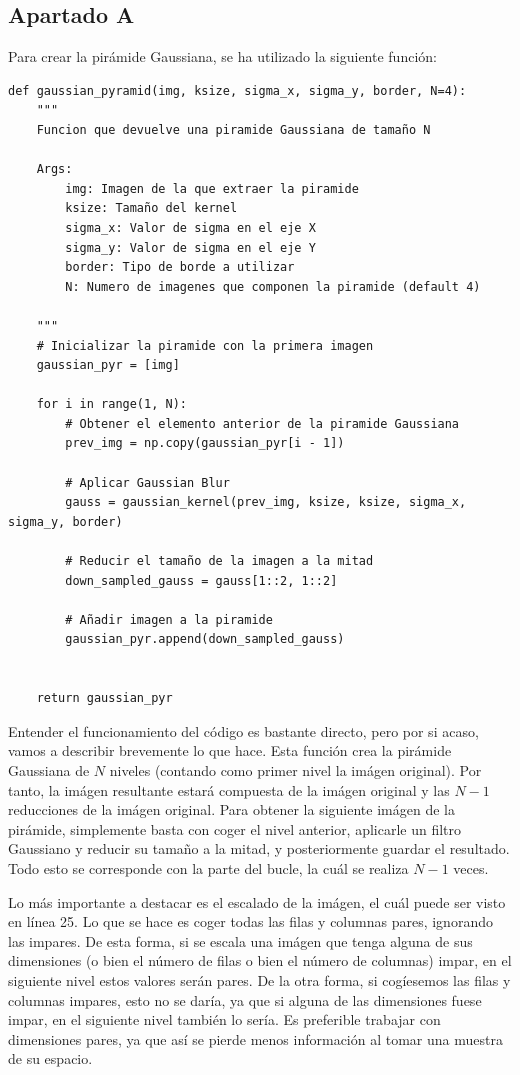 \documentclass[11pt,a4paper]{article}
\begin{document}
\subsection{Apartado A}

Para crear la pirámide Gaussiana, se ha utilizado la siguiente función:

\begin{lstlisting}[caption={Función que crea una priámide Gaussiana.},label={alg:guassian-pyramid}]
def gaussian_pyramid(img, ksize, sigma_x, sigma_y, border, N=4):
    """
    Funcion que devuelve una piramide Gaussiana de tamaño N

    Args:
        img: Imagen de la que extraer la piramide
        ksize: Tamaño del kernel
        sigma_x: Valor de sigma en el eje X
        sigma_y: Valor de sigma en el eje Y
        border: Tipo de borde a utilizar
        N: Numero de imagenes que componen la piramide (default 4)

    """
    # Inicializar la piramide con la primera imagen
    gaussian_pyr = [img]

    for i in range(1, N):
        # Obtener el elemento anterior de la piramide Gaussiana
        prev_img = np.copy(gaussian_pyr[i - 1])

        # Aplicar Gaussian Blur
        gauss = gaussian_kernel(prev_img, ksize, ksize, sigma_x, sigma_y, border)

        # Reducir el tamaño de la imagen a la mitad
        down_sampled_gauss = gauss[1::2, 1::2]

        # Añadir imagen a la piramide
        gaussian_pyr.append(down_sampled_gauss)


    return gaussian_pyr
\end{lstlisting}

Entender el funcionamiento del código es bastante directo, pero por si acaso, vamos a describir brevemente lo que hace. Esta
función crea la pirámide Gaussiana de $N$ niveles (contando como primer nivel la imágen original). Por tanto, la imágen
resultante estará compuesta de la imágen original y las $N - 1$ reducciones de la imágen original. Para obtener la siguiente
imágen de la pirámide, simplemente basta con coger el nivel anterior, aplicarle un filtro Gaussiano y reducir su tamaño a la
mitad, y posteriormente guardar el resultado. Todo esto se corresponde con la parte del bucle, la cuál se realiza $N - 1$ veces.

Lo más importante a destacar es el escalado de la imágen, el cuál puede ser visto en línea 25. Lo que se hace es coger todas las
filas y columnas pares, ignorando las impares. De esta forma, si se escala una imágen que tenga alguna de sus dimensiones (o bien
el número de filas o bien el número de columnas) impar, en el siguiente nivel estos valores serán pares. De la otra forma, si
cogíesemos las filas y columnas impares, esto no se daría, ya que si alguna de las dimensiones fuese impar, en el siguiente
nivel también lo sería. Es preferible trabajar con dimensiones pares, ya que así se pierde menos información al tomar una
muestra de su espacio.
\end{document}
